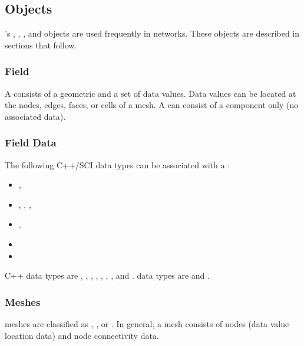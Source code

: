 \subsection{\sr{} Objects}
\label{sec:sr-objects}


\sr{}'s , , , and
 objects are used frequently in networks.  These
objects are described in sections that follow.

\subsubsection{Field}

A \sr{}  consists of a geometric  and a
set of data values.  Data values can be located at the nodes, edges,
faces, or cells of a mesh.  A  can consist of a
 component only (no associated data).

\subsubsection{Field Data}

The following C++/SCI data types can be associated with a :

\begin{itemize}
\item {}, 
\item {}, , , 
\item {}, 
\item {}
\item {}
\end{itemize}

C++ data types are , ,
, , ,
, , and .  \sr{} data types are  and .

\subsubsection{Meshes}

\sr{} meshes are classified as , , or
.  In general, a mesh consists of nodes (data value location
data) and node connectivity data.

